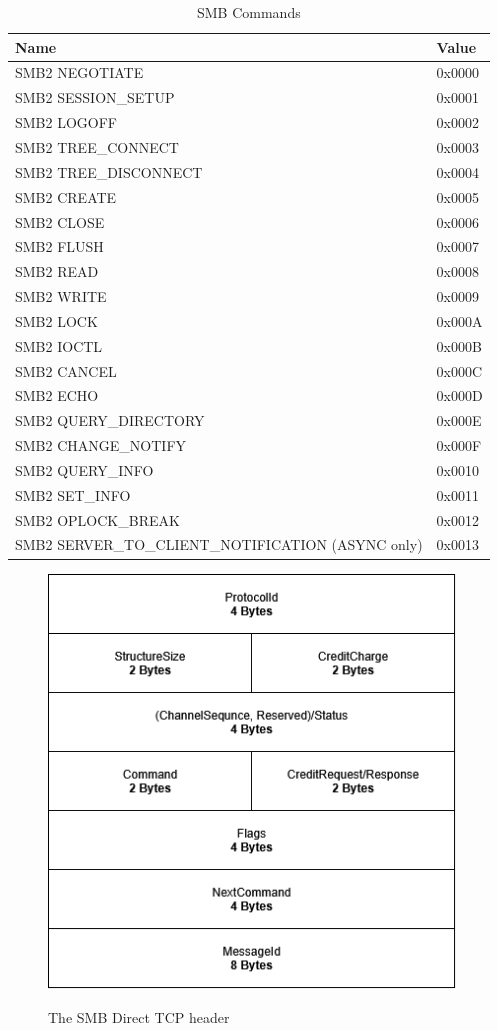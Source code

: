 \documentclass[english, 12pt, a4paper, elec, utf8, a-2b, online]{aaltothesis}
\begin{document}
\begin{table}[h]
\centering
\caption{SMB Commands}
\label{tab:smb_commands}
\begin{tabular}{|l|l|}
\hline
\textbf{Name} & \textbf{Value}\\ \hline
SMB2 NEGOTIATE & 0x0000 \\ \hline
SMB2 SESSION\_SETUP & 0x0001 \\ \hline
SMB2 LOGOFF & 0x0002 \\ \hline
SMB2 TREE\_CONNECT & 0x0003 \\ \hline
SMB2 TREE\_DISCONNECT & 0x0004 \\ \hline
SMB2 CREATE & 0x0005 \\ \hline
SMB2 CLOSE & 0x0006 \\ \hline
SMB2 FLUSH & 0x0007 \\ \hline
SMB2 READ & 0x0008 \\ \hline
SMB2 WRITE & 0x0009 \\ \hline
SMB2 LOCK & 0x000A \\ \hline
SMB2 IOCTL & 0x000B \\ \hline
SMB2 CANCEL & 0x000C \\ \hline
SMB2 ECHO & 0x000D \\ \hline
SMB2 QUERY\_DIRECTORY & 0x000E \\ \hline
SMB2 CHANGE\_NOTIFY & 0x000F \\ \hline
SMB2 QUERY\_INFO & 0x0010 \\ \hline
SMB2 SET\_INFO & 0x0011 \\ \hline
SMB2 OPLOCK\_BREAK & 0x0012 \\ \hline
SMB2 SERVER\_TO\_CLIENT\_NOTIFICATION (ASYNC only) & 0x0013 \\ \hline
\end{tabular}
\end{table}

\begin{figure}[h]
	\centering
	\includegraphics[alt={A block diagram of the SMB2 Packet header common fields format, detailing its fields and their sizes.}, height=11cm]{./images/smb_packet_header_common.png}
	\caption{The SMB Direct TCP header}
	\label{fig:smb2_transport_header}
\end{figure}
\end{document}
